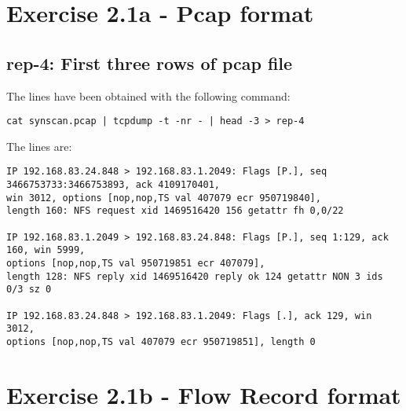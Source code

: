 \section*{Exercise 2.1a - Pcap format}
\subsection*{rep-4: First three rows of pcap file}
The lines have been obtained with the following command:
\begin{verbatim}
cat synscan.pcap | tcpdump -t -nr - | head -3 > rep-4
\end{verbatim}
The lines are:
\begin{verbatim}
IP 192.168.83.24.848 > 192.168.83.1.2049: Flags [P.], seq 3466753733:3466753893, ack 4109170401, 
win 3012, options [nop,nop,TS val 407079 ecr 950719840], 
length 160: NFS request xid 1469516420 156 getattr fh 0,0/22

IP 192.168.83.1.2049 > 192.168.83.24.848: Flags [P.], seq 1:129, ack 160, win 5999, 
options [nop,nop,TS val 950719851 ecr 407079], 
length 128: NFS reply xid 1469516420 reply ok 124 getattr NON 3 ids 0/3 sz 0

IP 192.168.83.24.848 > 192.168.83.1.2049: Flags [.], ack 129, win 3012, 
options [nop,nop,TS val 407079 ecr 950719851], length 0
\end{verbatim}

\section*{Exercise 2.1b - Flow Record format}
